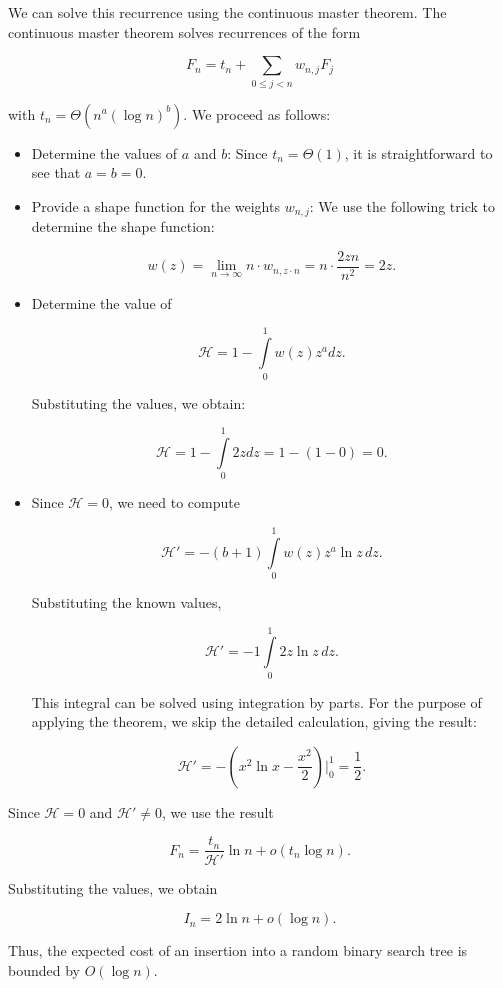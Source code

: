 We can solve this recurrence using the continuous master theorem. The continuous master theorem solves recurrences of the form

\[
F_n = t_n + \sum\limits_{0 \leq j < n} w_{n,j} F_j
\]

with \( t_n = \Theta(n^a (\log n)^b) \). We proceed as follows:

\begin{itemize}
    \item Determine the values of \( a \) and \( b \): Since \( t_n = \Theta(1) \), it is straightforward to see that \( a = b = 0 \).
    \item Provide a shape function for the weights \( w_{n,j} \): We use the following trick to determine the shape function:

    \[
    w(z) = \lim\limits_{n\to\infty} n \cdot w_{n,z\cdot n} = n \cdot \frac{2zn}{n^2} = 2z.
    \]

    \item Determine the value of 

    \[
    \mathcal{H} = 1 - \int\limits_{0}^{1} w(z) z^a dz.
    \]

    Substituting the values, we obtain:

    \[
    \mathcal{H} = 1 - \int\limits_{0}^{1} 2z dz = 1 - (1 - 0) = 0.
    \]

    \item Since \( \mathcal{H} = 0 \), we need to compute 

    \[
    \mathcal{H'} = -(b+1) \int\limits_{0}^{1} w(z) z^a \ln z \, dz.
    \]

    Substituting the known values,

    \[
    \mathcal{H'} = -1 \int\limits_{0}^{1} 2z \ln z \, dz.
    \]

    This integral can be solved using integration by parts. For the purpose of applying the theorem, we skip the detailed calculation, giving the result:

    \[
    \mathcal{H'} = - (x^2 \ln x - \frac{x^2}{2})\Big|_0^1 = \frac{1}{2}.
    \]

\end{itemize}

Since \( \mathcal{H} = 0 \) and \( \mathcal{H'} \neq 0 \), we use the result

\[
F_n = \frac{t_n}{\mathcal{H'}} \ln n + o(t_n \log n).
\]

Substituting the values, we obtain

\[
I_n = 2\ln n + o(\log n).
\]

Thus, the expected cost of an insertion into a random binary search tree is bounded by \( O(\log n) \).

